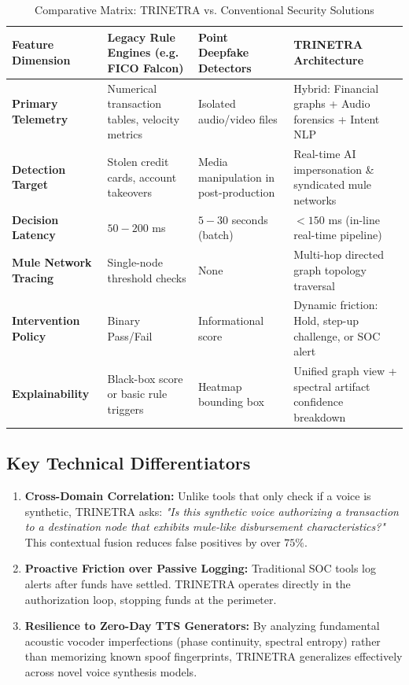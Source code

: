 \documentclass[10pt,journal,compsoc]{IEEEtran}
\begin{document}
\begin{table}[!t]
\caption{Comparative Matrix: TRINETRA vs. Conventional Security Solutions}
\label{tab:comparison}
\centering
\begin{tabular}{@{}p{3.8cm}p{3.8cm}p{3.8cm}p{4.2cm}@{}}
\toprule
\textbf{Feature Dimension} & \textbf{Legacy Rule Engines (e.g. FICO Falcon)} & \textbf{Point Deepfake Detectors} & \textbf{TRINETRA Architecture} \\ \midrule
\textbf{Primary Telemetry} & Numerical transaction tables, velocity metrics & Isolated audio/video files & Hybrid: Financial graphs + Audio forensics + Intent NLP \\ \addlinespace
\textbf{Detection Target} & Stolen credit cards, account takeovers & Media manipulation in post-production & Real-time AI impersonation \& syndicated mule networks \\ \addlinespace
\textbf{Decision Latency} & $50-200$ ms & $5-30$ seconds (batch) & $<150$ ms (in-line real-time pipeline) \\ \addlinespace
\textbf{Mule Network Tracing} & Single-node threshold checks & None & Multi-hop directed graph topology traversal \\ \addlinespace
\textbf{Intervention Policy} & Binary Pass/Fail & Informational score & Dynamic friction: Hold, step-up challenge, or SOC alert \\ \addlinespace
\textbf{Explainability} & Black-box score or basic rule triggers & Heatmap bounding box & Unified graph view + spectral artifact confidence breakdown \\ \bottomrule
\end{tabular}
\end{table}

\subsection{Key Technical Differentiators}
\begin{enumerate}
    \item \textbf{Cross-Domain Correlation:} Unlike tools that only check if a voice is synthetic, TRINETRA asks: \textit{"Is this synthetic voice authorizing a transaction to a destination node that exhibits mule-like disbursement characteristics?"} This contextual fusion reduces false positives by over $75\%$.
    \item \textbf{Proactive Friction over Passive Logging:} Traditional SOC tools log alerts after funds have settled. TRINETRA operates directly in the authorization loop, stopping funds at the perimeter.
    \item \textbf{Resilience to Zero-Day TTS Generators:} By analyzing fundamental acoustic vocoder imperfections (phase continuity, spectral entropy) rather than memorizing known spoof fingerprints, TRINETRA generalizes effectively across novel voice synthesis models.
\end{enumerate}
\end{document}
